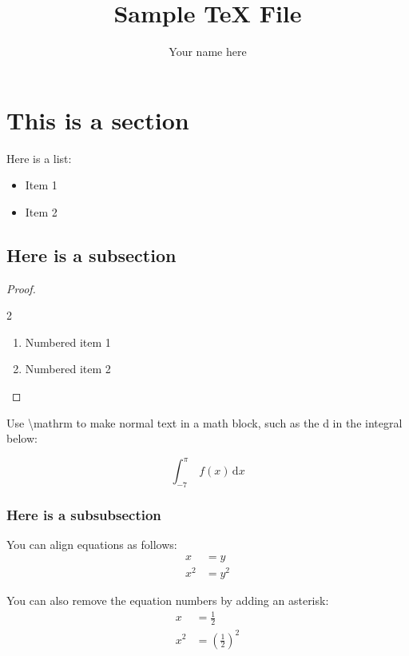 \documentclass[12pt]{article}
\newcommand{\parens}[1]{\left(#1\right)}
\newcommand{\gap}{\vspace{3mm}}
\begin{document}
\title{Sample TeX File}
\author{Your name here}
\date{}

\maketitle

\tableofcontents{}
\newpage

\section{This is a section}
Here is a list:
\begin{itemize}[noitemsep, topsep=0pt, label=-]
\item Item 1
\item Item 2
\end{itemize}

\gap

\subsection{Here is a subsection}
\begin{proof} \quad %
\begin{spreadlines}{2\baselineskip}
\begin{enumerate}[label=(\alph*)]
\item Numbered item 1
\item Numbered item 2
\end{enumerate}
\end{spreadlines}
\end{proof}

Use \textbackslash{}mathrm to make normal text in a math block, such as the d in the integral below:

\begin{equation}
\int_{-7}^{\pi } \; f(x) \, \mathrm{d}x
\end{equation}

\gap

\subsubsection{Here is a subsubsection}
You can align equations as follows:
\begin{align}
x&=y\\
x^2&=y^2
\end{align}

You can also remove the equation numbers by adding an asterisk:
\begin{align*}
x&=\frac{1}{2}\\
x^2&=\parens{\frac{1}{2}}^2
\end{align*}
\end{document}
